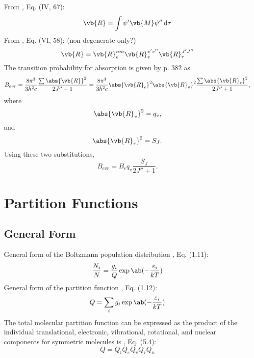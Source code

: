 \documentclass[11pt, twoside, fleqn]{report}
\begin{document}
From \cite{herzbergMolecularSpectraMolecular1950}, Eq. (IV, 67):
\begin{equation*}
    \vb{R} = \int \psi'\vb{M}\psi'' \odif{\tau}
\end{equation*}
From \cite{herzbergMolecularSpectraMolecular1950}, Eq. (VI, 58): (non-degenerate only?)
\begin{equation*}
    \vb{R} = \vb{R}_e^{nm}\vb{R}_v^{v'v''}\vb{R}_r^{J'J''}
\end{equation*}
The transition probability for absorption is given by \cite{herzbergMolecularSpectraMolecular1950} p. 382 as
\begin{equation*}
    B_{evr} = \frac{8\pi^3}{3h^2c}\frac{\sum\abs{\vb{R}}^2}{2J'' + 1} = \frac{8\pi^3}{3h^2c}\abs{\vb{R}_e}^2\abs{\vb{R}_v}^2\frac{\sum\abs{\vb{R}_r}^2}{2J'' + 1},
\end{equation*}
where
\begin{equation*}
    \abs{\vb{R}_v}^2 = q_v,
\end{equation*}
and
\begin{equation*}
    \abs{\vb{R}_r}^2 = S_J.
\end{equation*}
Using these two substitutions,
\begin{equation*}
    B_{evr} = B_eq_v\frac{S_J}{2J'' + 1}.
\end{equation*}

\section{Partition Functions}

\subsection{General Form}

General form of the Boltzmann population distribution \cite{hansonSpectroscopyOpticalDiagnostics2016}, Eq. (1.11):
\begin{equation*}
    \frac{N_i}{N} = \frac{g_i}{Q}\exp\ab(-\frac{\varepsilon_i}{kT})
\end{equation*}
General form of the partition function \cite{hansonSpectroscopyOpticalDiagnostics2016}, Eq. (1.12):
\begin{equation*}
    Q = \sum_i g_i\exp\ab(-\frac{\varepsilon_i}{kT})
\end{equation*}
The total molecular partition function can be expressed as the product of the individual translational, electronic, vibrational, rotational, and nuclear components for symmetric molecules is \cite{hansonSpectroscopyOpticalDiagnostics2016}, Eq. (5.4):
\begin{equation*}
    Q = Q_tQ_eQ_vQ_rQ_n
\end{equation*}
\end{document}
